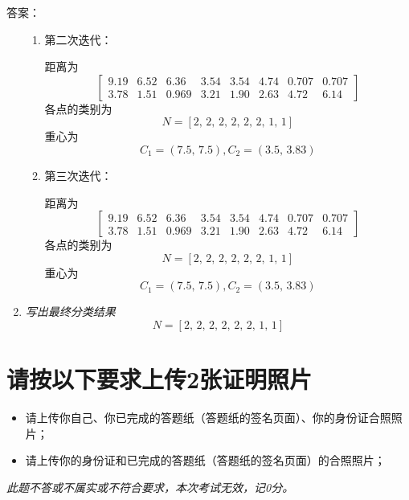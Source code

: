 \documentclass[11pt]{article}
\newenvironment{solution}[1][10cm]{答案：}{}
\newenvironment{solution}[1][10cm]{答案：\vspace{#1}\hide}
    {\endhide}
\begin{document}
\begin{solution}
\begin{enumerate}
\begin{enumerate}
        \item 第二次迭代：
            
        距离为
        \begin{equation*}
            \left[\begin{array}{rrrrrrrr}
                9.19 & 6.52 & 6.36 & 3.54 & 3.54 & 4.74 & 0.707 & 0.707 \\
                3.78 & 1.51 & 0.969 & 3.21 & 1.90 & 2.63 & 4.72 & 6.14
                \end{array}\right]
        \end{equation*}
        各点的类别为
        \begin{equation*}
            N = \left[2,\,2,\,2,\,2,\,2,\,2,\,1,\,1\right]
        \end{equation*}
        重心为
        \begin{equation*}
            C_1 = (7.5,\, 7.5),C_2=(3.5,\, 3.83)
        \end{equation*}

        \item 第三次迭代：
            
        距离为
        \begin{equation*}
            \left[\begin{array}{rrrrrrrr}
                9.19 & 6.52 & 6.36 & 3.54 & 3.54 & 4.74 & 0.707 & 0.707 \\
                3.78 & 1.51 & 0.969 & 3.21 & 1.90 & 2.63 & 4.72 & 6.14
                \end{array}\right]
        \end{equation*}
        各点的类别为
        \begin{equation*}
            N = \left[2,\,2,\,2,\,2,\,2,\,2,\,1,\,1\right]
        \end{equation*}
        重心为
        \begin{equation*}
            C_1 = (7.5,\, 7.5),C_2=(3.5,\, 3.83)
        \end{equation*}
        
    \end{enumerate}

    \item \emph{写出最终分类结果}
    \begin{equation*}
        N = \left[2,\,2,\,2,\,2,\,2,\,2,\,1,\,1\right]
    \end{equation*}
    \end{enumerate}
\end{solution}

\section{请按以下要求上传2张证明照片}
\begin{itemize}
    \item 请上传你自己、你已完成的答题纸（答题纸的签名页面）、你的身份证合照照片；
    \item 请上传你的身份证和已完成的答题纸（答题纸的签名页面）的合照照片；
\end{itemize}
\emph{此题不答或不属实或不符合要求，本次考试无效，记0分。}
\end{document}

